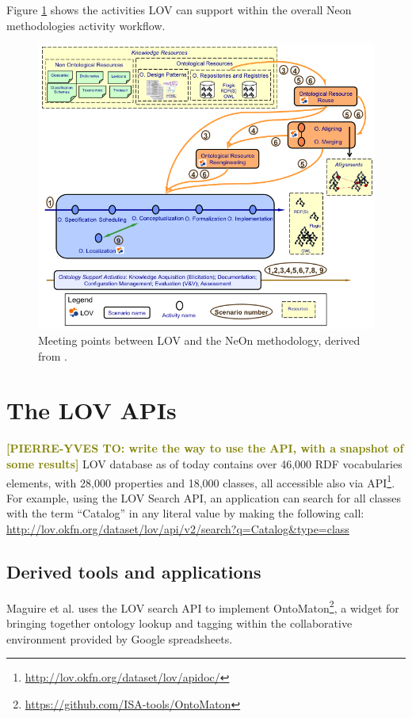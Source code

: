 \documentclass{iosart2c}
\newcommand{\py}[1]{\textcolor{olive}{\textbf{[PIERRE-YVES TO:#1]}}}
\begin{document}
Figure \ref{fig:LOVandNeOn} shows the activities LOV can support within the overall Neon methodologies activity workflow.
\begin{figure}[h!tp]
\centering
  \includegraphics[width=.80\linewidth]{neonScenarios.png}
  \caption{Meeting points between LOV and the NeOn methodology, derived from \cite{MC10}.}
  \label{fig:LOVandNeOn}
\end{figure}

\section{The LOV APIs}
\label{sec:lovapi}
\py{ write the way to use the API, with a snapshot of some results}
LOV database as of today contains over 46,000 RDF vocabularies elements, with 28,000 properties and 18,000 classes, all accessible also via API\footnote{\url{http://lov.okfn.org/dataset/lov/apidoc/}}. For example, using the LOV Search API, an application can search for all classes with the term ``Catalog'' in any literal value by making the following call: \url{http://lov.okfn.org/dataset/lov/api/v2/search?q=Catalog&type=class}
 
\subsection{Derived tools and applications}

Maguire et al. \cite{ontomaton12} uses the LOV search API to implement OntoMaton\footnote{\url{https://github.com/ISA-tools/OntoMaton}}, a widget for bringing together ontology lookup and tagging within the collaborative environment provided by Google spreadsheets. 
\end{document}
